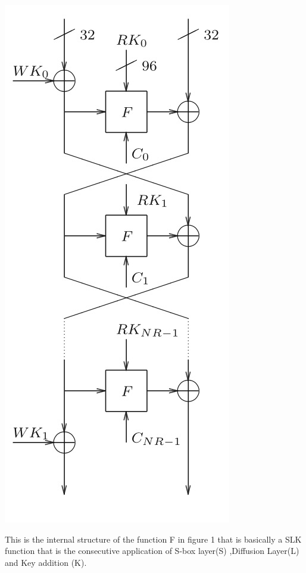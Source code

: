 \includegraphics[scale=0.6]{project/images/2.jpg}

This is the  internal structure of the function F in figure 1 that is basically a SLK function that is the consecutive application of S-box layer(S) ,Diffusion Layer(L) and Key addition (K).


\section*{\fontsize{20}{24}\selectfont{\color{red} {Substitution and Diffusion:}}}

